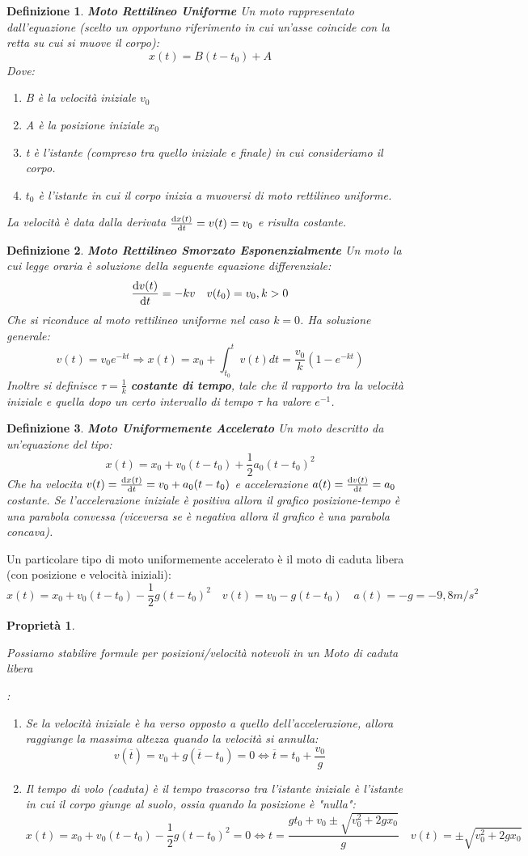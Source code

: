 \documentclass{article}
\newtheorem{property}{Proprietà}[section]
\newtheorem{defn}{Definizione}[section]
\newcommand{\note}{\noindent {\quad \bf \underline{Osservazione:}} \quad}
\newcommand{\then}{\ensuremath{\Rightarrow}}
\begin{document}
\begin{defn}
\textbf{Moto Rettilineo Uniforme} Un moto rappresentato dall'equazione (scelto un opportuno riferimento in cui un'asse coincide con la retta su cui si muove il corpo):
\[x(t)=B(t-t_0)+A\]
Dove:
\begin{enumerate}
    \item B è la velocità iniziale $v_0$
    \item A è la posizione iniziale $x_0$
    \item t è l'istante (compreso tra quello iniziale e finale) in cui consideriamo il corpo.
    \item $t_0$ è l'istante in cui il corpo inizia a muoversi di moto rettilineo uniforme.
\end{enumerate}
La velocità è data dalla derivata \(\dv{x(t)}{t}=v(t)=v_0\) e risulta costante.
\end{defn}
\begin{defn}
\textbf{Moto Rettilineo Smorzato Esponenzialmente} Un moto la cui legge oraria è soluzione della seguente equazione differenziale:
\[\dv{v(t)}{t}=-kv\quad v(t_0)=v_0, k>0\]
Che si riconduce al moto rettilineo uniforme nel caso $k=0$. Ha soluzione generale:
\[v(t)=v_0e^{-kt}\then x(t)=x_0+\int_{t_0}^tv(t)dt=\frac{v_0}{k}(1-e^{-kt})\]
Inoltre si definisce $\tau=\frac{1}{k}$ \textbf{costante di tempo}, tale che il rapporto tra la velocità iniziale e quella dopo un certo intervallo di tempo $\tau$ ha valore $e^{-1}$.
\end{defn}

\begin{defn}
\textbf{Moto Uniformemente Accelerato} Un moto descritto da un'equazione del tipo:
\[x(t)=x_0+v_0(t-t_0)+\frac{1}{2}a_0(t-t_0)^2\]
Che ha velocita $v(t)=\dv{x(t)}{t}=v_0+a_0(t-t_0)$ e accelerazione $a(t)=\dv{v(t)}{t}=a_0$ costante.
Se l'accelerazione iniziale è positiva allora il grafico posizione-tempo è una parabola convessa (viceversa se è negativa allora il grafico è una parabola concava).
\end{defn}
\note Un particolare tipo di moto uniformemente accelerato è il moto di caduta libera (con posizione e velocità iniziali):
\[x(t)=x_0+v_0(t-t_0)-\frac{1}{2}g(t-t_0)^2\quad v(t)=v_0-g(t-t_0)\quad a(t)=-g=-9,8 m/s^2\]
\begin{property}
\hypertarget{formulemotounifacc}{Possiamo stabilire formule per posizioni/velocità notevoli in un Moto di caduta libera}:
\begin{enumerate}
    \item Se la velocità iniziale è ha verso opposto a quello dell'accelerazione, allora raggiunge la massima altezza quando la velocità si annulla:
    \[v(\overline{t})=v_0+g(\overline{t}-t_0)=0\iff \overline{t}=t_0+\frac{v_0}{g}\]
    \item Il tempo di volo (caduta) è il tempo trascorso tra l'istante iniziale è l'istante in cui il corpo giunge al suolo, ossia quando la posizione è "nulla":
    \[x(t)=x_0+v_0(t-t_0)-\frac{1}{2}g(t-t_0)^2=0\iff t=\frac{gt_0+v_0\pm\sqrt{v_0^2+2gx_0}}{g}\quad v(t)=\pm\sqrt{v_0^2+2gx_0}\]
\end{enumerate}
\end{property}
\end{document}
